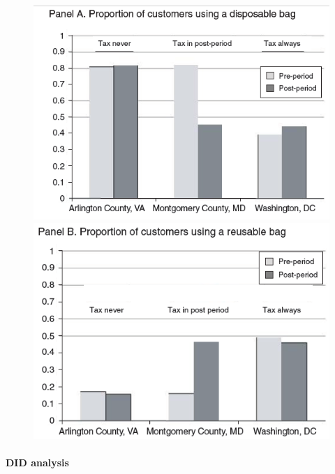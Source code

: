 \documentclass[../root]{subfiles}
\begin{document}
    \begin{figure}[ht]
      \centering
      \includegraphics[scale = .8]{0807tanji/F3A}
      \includegraphics[scale = .8]{0807tanji/F3B}
    \end{figure}

    \paragraph{DID analysis}
\end{document}
